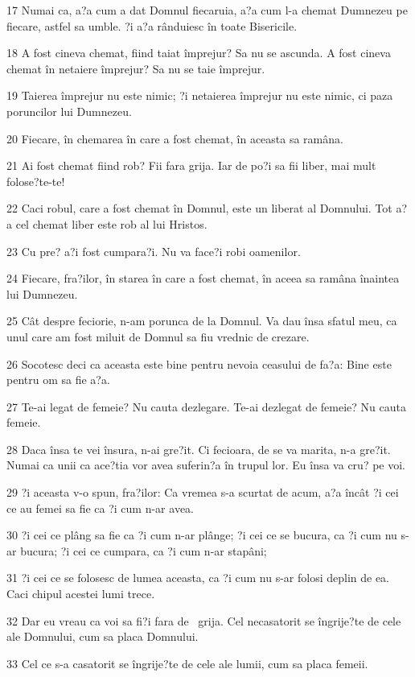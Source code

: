 \par 17 Numai ca, a?a cum a dat Domnul fiecaruia, a?a cum l-a chemat Dumnezeu pe fiecare, astfel sa umble. ?i a?a rânduiesc în toate Bisericile.
\par 18 A fost cineva chemat, fiind taiat împrejur? Sa nu se ascunda. A fost cineva chemat în netaiere împrejur? Sa nu se taie împrejur.
\par 19 Taierea împrejur nu este nimic; ?i netaierea împrejur nu este nimic, ci paza poruncilor lui Dumnezeu.
\par 20 Fiecare, în chemarea în care a fost chemat, în aceasta sa ramâna.
\par 21 Ai fost chemat fiind rob? Fii fara grija. Iar de po?i sa fii liber, mai mult folose?te-te!
\par 22 Caci robul, care a fost chemat în Domnul, este un liberat al Domnului. Tot a?a cel chemat liber este rob al lui Hristos.
\par 23 Cu pre? a?i fost cumpara?i. Nu va face?i robi oamenilor.
\par 24 Fiecare, fra?ilor, în starea în care a fost chemat, în aceea sa ramâna înaintea lui Dumnezeu.
\par 25 Cât despre feciorie, n-am porunca de la Domnul. Va dau însa sfatul meu, ca unul care am fost miluit de Domnul sa fiu vrednic de crezare.
\par 26 Socotesc deci ca aceasta este bine pentru nevoia ceasului de fa?a: Bine este pentru om sa fie a?a.
\par 27 Te-ai legat de femeie? Nu cauta dezlegare. Te-ai dezlegat de femeie? Nu cauta femeie.
\par 28 Daca însa te vei însura, n-ai gre?it. Ci fecioara, de se va marita, n-a gre?it. Numai ca unii ca ace?tia vor avea suferin?a în trupul lor. Eu însa va cru? pe voi.
\par 29 ?i aceasta v-o spun, fra?ilor: Ca vremea s-a scurtat de acum, a?a încât ?i cei ce au femei sa fie ca ?i cum n-ar avea.
\par 30 ?i cei ce plâng sa fie ca ?i cum n-ar plânge; ?i cei ce se bucura, ca ?i cum nu s-ar bucura; ?i cei ce cumpara, ca ?i cum n-ar stapâni;
\par 31 ?i cei ce se folosesc de lumea aceasta, ca ?i cum nu s-ar folosi deplin de ea. Caci chipul acestei lumi trece.
\par 32 Dar eu vreau ca voi sa fi?i fara de  grija. Cel necasatorit se îngrije?te de cele ale Domnului, cum sa placa Domnului.
\par 33 Cel ce s-a casatorit se îngrije?te de cele ale lumii, cum sa placa femeii.
